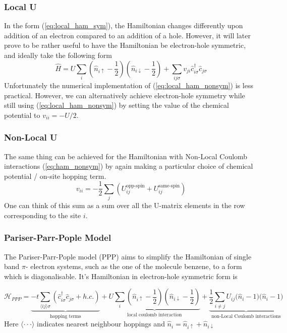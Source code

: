 \subsubsection{Local U}
In the form (\ref{eq:local_ham_sym}), the Hamiltonian changes differently upon addition of an electron compared to an addition of a hole. However, it will later prove to be rather useful to have the Hamiltonian be electron-hole symmetric, and ideally take the following form
\begin{equation}
    \hat{H} = U \sum_i \left(\hat{n}_{i\uparrow}-\frac{1}{2}\right)\left(\hat{n}_{i\downarrow}-\frac{1}{2}\right)+\sum_{i j \sigma} v_{j i} \hat{c}_{i \sigma}^{\dagger} \hat{c}_{j \sigma}\label{eq:local_ham_sym}
\end{equation}
Unfortunately the numerical implementation of (\ref{eq:local_ham_nonsym}) is less practical. However, we can alternatively achieve electron-hole symmetry while still using (\ref{eq:local_ham_nonsym}) by setting the value of the chemical potential to $v_{ii} = -U / 2$.
\medskip

\subsubsection{Non-Local U}
The same thing can be achieved for the Hamiltonian with Non-Local Coulomb interactions (\ref{eq:ham_nonsym}) by again making a particular choice of chemical potential / on-site hopping term. 
\begin{equation}
    v_{ii} = - \frac{1}{2}\sum_{j}\left( U_{ij}^{\text{opp-spin}} + U_{ij}^{\text{same-spin}}\right)
\end{equation}
One can think of this sum as a sum over all the U-matrix elements in the row corresponding to the site $i$. 


\subsubsection{Pariser-Parr-Pople Model}\label{subsec:ppp}

The Pariser-Parr-Pople model (PPP) aims to simplify the Hamiltonian of single band $\pi$- electron systems, such as the one of the molecule benzene, to a form which is diagonalisable. It's Hamiltonian in electron-hole symmetric form is

\begin{equation}
    \mathcal{H}_{PPP} = \underbrace{-t \sum_{\langle ij \rangle \sigma} \left(\hat{c}^\dagger_{i\sigma}\hat{c}_{j\sigma} + h.c.\right) 
    }_{\text{hopping terms}}
    + \underbrace{U \sum_i \left(\hat{n}_{i\uparrow} - \frac{1}{2}\right)\left(\hat{n}_{i\downarrow} - \frac{1}{2}\right)
    }_{\text{local coulomb interaction}}
    + \underbrace{\frac{1}{2}\sum_{i\neq j} U_{ij} \bigg(\hat{n}_{i} - 1\bigg)\bigg(\hat{n}_{i} - 1\bigg)
    }_{\text{non-Local Coulomb interactions}}
\end{equation}
Here $\langle \cdot\cdot\cdot \rangle$ indicates nearest neighbour hoppings and $\hat{n}_i = \hat{n}_{i\uparrow} + \hat{n}_{i\downarrow}$
\\

